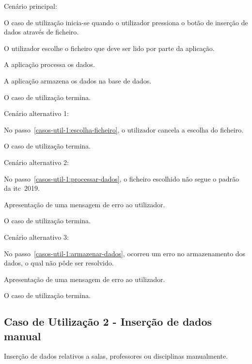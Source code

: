 Cenário principal:

\begin{compactenum}
    \item O caso de utilização inicia-se quando o utilizador pressiona o botão de inserção de dados através de ficheiro.
    \item O utilizador escolhe o ficheiro que deve ser lido por parte da aplicação. \label{casos-util-1:escolha-ficheiro}
    \item A aplicação processa os dados. \label{casos-util-1:processar-dados}
    \item A aplicação armazena os dados na base de dados. \label{casos-util-1:armazenar-dados}
    \item O caso de utilização termina.
\end{compactenum}

Cenário alternativo 1:

\begin{compactenum}
    \item No passo~\ref{casos-util-1:escolha-ficheiro}, o utilizador cancela a escolha do ficheiro.
    \item O caso de utilização termina.
\end{compactenum}

Cenário alternativo 2:

\begin{compactenum}
    \item No passo~\ref{casos-util-1:processar-dados}, o ficheiro escolhido não segue o padrão da \gls{itc}~2019.
    \item Apresentação de uma mensagem de erro ao utilizador.
    \item O caso de utilização termina.
\end{compactenum}

Cenário alternativo 3:

\begin{compactenum}
    \item No passo~\ref{casos-util-1:armazenar-dados}, ocorreu um erro no armazenamento dos dados, o qual não pôde ser resolvido.
    \item Apresentação de uma mensagem de erro ao utilizador.
    \item O caso de utilização termina.
\end{compactenum}

\subsection*{Caso de Utilização 2 - Inserção de dados manual}
Inserção de dados relativos a salas, professores ou disciplinas manualmente.

